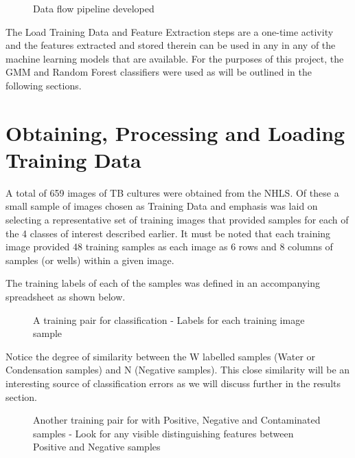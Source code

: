 \documentclass[a4paper,twoside,12pt]{report}
\begin{document}
\begin{figure}[!htbp]
\centering
\caption[Data flow pipeline] {Data flow pipeline developed}
\end{figure}

The Load Training Data and Feature Extraction steps are a one-time activity and the features extracted and stored therein can be used in any in any of the machine learning models that are available.  For the purposes of this project, the GMM and Random Forest classifiers were used as will be outlined in the following sections. 

\section{Obtaining, Processing and Loading Training Data} 
A total of 659 images of TB cultures were obtained from the NHLS.   Of these a small sample of images chosen as Training Data and emphasis was laid on selecting a representative set of training images that provided samples for each of the 4 classes of interest described earlier.  It must be noted that each training image provided 48 training samples as each image as 6 rows and 8 columns of samples (or wells) within a given image.  

The training labels of each of the samples was defined in an accompanying spreadsheet as shown below. 

\begin{figure}[!htbp]
\centering
{}\hfill
{}
\caption{A training pair for classification - Labels for each training image sample}
\label{fig:subfigures}
\end{figure}

Notice the degree of similarity between the W labelled samples (Water or Condensation samples) and N (Negative samples).   This close similarity will be an interesting source of classification errors as we will discuss further in the results section. 

\begin{figure}[!htbp]
\centering
{}\hfill
{}
\caption{Another training pair for with Positive, Negative and Contaminated samples - Look for any visible distinguishing features between Positive and Negative samples}
\label{fig:subfigures}
\end{figure}
\end{document}
